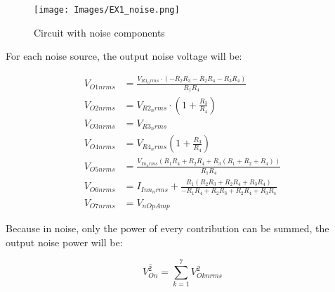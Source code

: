 \begin{figure}[H]
    \centering
    \texttt{[image: Images/EX1\_noise.png]}
    \caption{Circuit with noise components}
    \label{Ex1noise}
\end{figure}

For each noise source, the output noise voltage will be:

\begin{equation}
    \begin{aligned}
        V_{O1nrms} &= \frac{V_{R1_nrms} \cdot \left(- R_{2} R_{3} - R_{2} R_{4} - R_{3} R_{4}\right)}{R_{1} R_{4}} \\
        V_{O2nrms} &= V_{R2_nrms} \cdot \left(1 + \frac{R_{3}}{R_{4}}\right)  \\
        V_{O3nrms} &= V_{R3_nrms}\\
        V_{O4nrms} &= V_{R4_nrms} \left(1 + \frac{R_{3}}{R_{4}} \right)\\
        V_{O5nrms} &= \frac{V_{In_nrms} \left(R_{1} R_{4} + R_{2} R_{4} + R_{3} \left(R_{1} + R_{2} + R_{4}\right)\right)}{R_{1} R_{4}}\\
        V_{O6nrms} &= I_{Inn_nrms} + \frac{R_{1} \left(R_{2} R_{3} + R_{2} R_{4} + R_{3} R_{4}\right)}{- R_{1} R_{4} + R_{2} R_{3} + R_{2} R_{4} + R_{3} R_{4}} \\
        V_{O7nrms} &= V_{nOpAmp}
    \end{aligned}
\end{equation}

Because in noise, only the power of every contribution can be summed, the output noise power will be:

\begin{equation}
    \overline{V_{On}^2} = \sum_{k = 1}^{7} V_{Oknrms}^2
\end{equation}